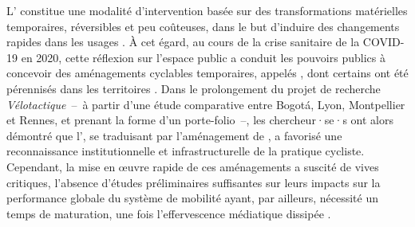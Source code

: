 \begin{refsegment}
{    L’ constitue une modalité d’intervention basée sur des transformations matérielles temporaires, réversibles et peu coûteuses, dans le but d'induire des changements rapides dans les usages \textcolor{blue}{\autocite{lydon_tactical_2015}}. À cet égard, au cours de la crise sanitaire de la COVID-19 en 2020, cette réflexion sur l’espace public a conduit les pouvoirs publics à concevoir des aménagements cyclables temporaires, appelés , dont certains ont été pérennisés dans les territoires \textcolor{blue}{\autocite{ortar_cycling_2024}}. Dans le prolongement du projet de recherche \textsl{Vélotactique}~–~à partir d'une étude comparative entre Bogotá, Lyon, Montpellier et Rennes, et prenant la forme d'un porte-folio~–, les chercheur·se·s \textcolor{blue}{\textcite[11]{chapelon_urbanisme_2023}} ont alors démontré que l', se traduisant par l'aménagement de , a favorisé une reconnaissance institutionnelle et infrastructurelle de la pratique cycliste. Cependant, la mise en œuvre rapide de ces aménagements a suscité de vives critiques, l'absence d'études préliminaires suffisantes sur leurs impacts sur la performance globale du système de mobilité ayant, par ailleurs, nécessité un temps de maturation, une fois l'effervescence médiatique dissipée \textcolor{blue}{\autocite[61]{thebert_public_2024}}.
}
\end{refsegment}
